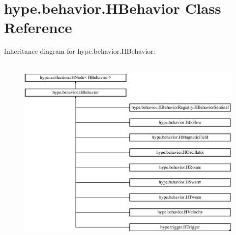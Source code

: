 \hypertarget{classhype_1_1behavior_1_1_h_behavior}{\section{hype.\-behavior.\-H\-Behavior Class Reference}
\label{classhype_1_1behavior_1_1_h_behavior}
}
Inheritance diagram for hype.\-behavior.\-H\-Behavior\-:\begin{figure}[H]
\begin{center}
\leavevmode
\includegraphics[height=9.595016cm]{classhype_1_1behavior_1_1_h_behavior}
\end{center}
\end{figure}
